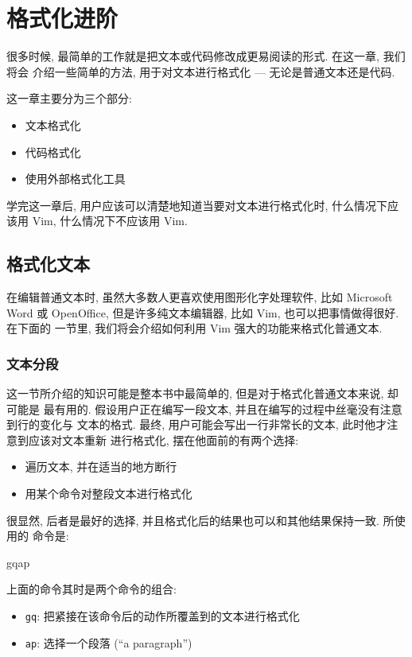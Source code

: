 \chapter{格式化进阶}
\label{chap:advanced_formatting}

很多时候, 最简单的工作就是把文本或代码修改成更易阅读的形式. 在这一章, 我们将会
介绍一些简单的方法, 用于对文本进行格式化 --- 无论是普通文本还是代码.

这一章主要分为三个部分:
\begin{itemize}
    \item 文本格式化
    \item 代码格式化
    \item 使用外部格式化工具
\end{itemize}

学完这一章后, 用户应该可以清楚地知道当要对文本进行格式化时, 什么情况下应该用
Vim, 什么情况下不应该用 Vim.

\section{格式化文本}
\label{sec:formatting_text}

在编辑普通文本时, 虽然大多数人更喜欢使用图形化字处理软件, 比如 Microsoft Word
或 OpenOffice, 但是许多纯文本编辑器, 比如 Vim, 也可以把事情做得很好. 在下面的
一节里, 我们将会介绍如何利用 Vim 强大的功能来格式化普通文本.

\subsection{文本分段}
\label{subsec:putting_text_into_paragraphs}

这一节所介绍的知识可能是整本书中最简单的, 但是对于格式化普通文本来说, 却可能是
最有用的. 假设用户正在编写一段文本, 并且在编写的过程中丝毫没有注意到行的变化与
文本的格式. 最终, 用户可能会写出一行非常长的文本, 此时他才注意到应该对文本重新
进行格式化, 摆在他面前的有两个选择:
\begin{itemize}
    \item 遍历文本, 并在适当的地方断行
    \item 用某个命令对整段文本进行格式化
\end{itemize}
很显然, 后者是最好的选择, 并且格式化后的结果也可以和其他结果保持一致. 所使用的
命令是:
\begin{vimcode}
gqap
\end{vimcode}
上面的命令其时是两个命令的组合:
\begin{itemize}
    \item \texttt{gq}: 把紧接在该命令后的动作所覆盖到的文本进行格式化
    \item \texttt{ap}: 选择一个段落 (``a paragraph'')
\end{itemize}

